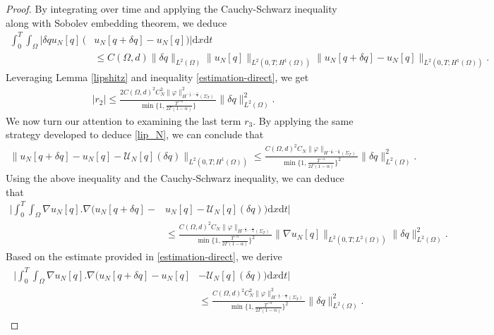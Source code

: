 \documentclass[a4paper,12pt,reqno,natbib]{amsart}
\newcommand{\dx} {\displaystyle\mathrm{d}x}
\newcommand{\dt} {\displaystyle\mathrm{d}t}
\begin{document}
\begin{proof}
By integrating over time and applying the Cauchy-Schwarz inequality along with Sobolev embedding theorem, we deduce
\begin{align*} 
\int_0^T\int_\Omega \Big|\delta q u_N[q]\, \Big( &u_N[q+\delta q]- u_N[q]\Big)\Big|\dx\dt\\&\leq C(\Omega,d) \|\delta q \|_{L^{2}(\Omega)}\| u_N[q]\|_{L^2(0,T;H^{1}(\Omega))}\| u_N[q+\delta q]- u_N[q]\|_{L^2(0,T;H^{1}(\Omega))}.
\end{align*}
Leveraging Lemma \ref{lipshitz} and inequality \eqref{estimation-direct}, we get
\begin{align}
    \label{r_2}
    \Big|r_2\Big| \leq \frac{2C(\Omega,d)^2 C_N^2\|\varphi\|^2_{H^{-\frac{1}{2}, -\frac{\alpha}{4} }(\Sigma_T)}}{\min\{1,\frac{T^{-\alpha}}{2\Gamma(1-\alpha)}\}} \|\delta q \|_{L^{2}(\Omega)}^2.
\end{align}
We now turn our attention to examining the last term $r_3$. By applying the same strategy developed to deduce \eqref{lip_N}, we can conclude that
\begin{align*}
    \|u_N[q+\delta q]- u_N[q]-\mathcal{U}_N[q](\delta q)\|_{L^2(0,T;H^1(\Omega))} \leq \frac{C(\Omega,d)^2C_N\|\varphi\|_{H^{-\frac{1}{2}, -\frac{\alpha}{4} }(\Sigma_T)}}{\min\{1,\frac{T^{-\alpha}}{2\Gamma(1-\alpha)}\}^2}\|\delta q\|_{L^2(\Omega)}^2.
\end{align*}
Using the above inequality and the Cauchy-Schwarz inequality, we can deduce that
\begin{align*}
    \Big|\int_0^T\int_{\Omega} \nabla u_N[q] . \nabla\Big( u_N[q+\delta q]- &u_N[q]-\mathcal{U}_N[q](\delta q)\Big) \dx\dt\Big|\\&\leq \frac{C(\Omega,d)^2C_N\|\varphi\|_{H^{-\frac{1}{2}, -\frac{\alpha}{4} }(\Sigma_T)}}{\min\{1,\frac{T^{-\alpha}}{2\Gamma(1-\alpha)}\}^2}\|\nabla u_N[q]\|_{L^2(0,T;L^2(\Omega))}\|\delta q\|_{L^2(\Omega)}^2.
\end{align*}
Based on the estimate provided in \eqref{estimation-direct}, we derive
\begin{align}
\begin{split}
    \Big|\int_0^T\int_{\Omega} \nabla u_N[q] . \nabla\Big( u_N[q+\delta q]- u_N[q]&-\mathcal{U}_N[q](\delta q)\Big) \dx\dt\Big|\\
    &\leq \frac{C(\Omega,d)^2C_N^2\|\varphi\|^2_{H^{-\frac{1}{2}, -\frac{\alpha}{4} }(\Sigma_T)}}{\min\{1,\frac{T^{-\alpha}}{2\Gamma(1-\alpha)}\}^2}\|\delta q\|_{L^2(\Omega)}^2.
\label{nj_3}
\end{split}
\end{align}

\end{proof}
\end{document}
